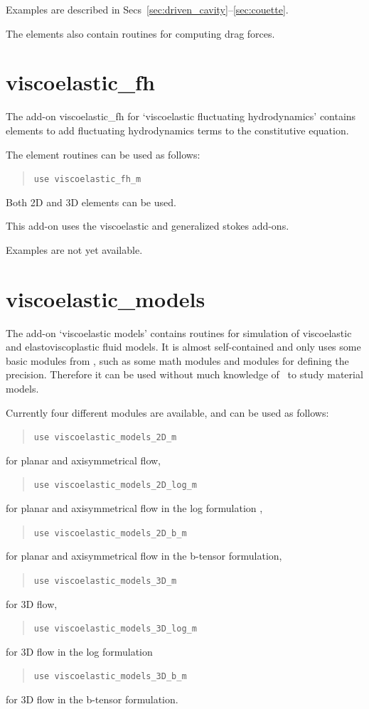 Examples are described in Secs~\ref{sec:driven_cavity}--\ref{sec:couette}.

The elements also contain routines for computing drag forces.

\section{viscoelastic\_fh}
\label{sec:viscoelastic_fh}

The add-on viscoelastic\_fh for `viscoelastic fluctuating hydrodynamics' contains elements to
add fluctuating hydrodynamics terms to the constitutive equation.

The element routines can be used as follows:
\begin{quote}
   \texttt{use viscoelastic\_fh\_m}
\end{quote}
Both 2D and 3D elements can be used.

This add-on uses the viscoelastic and generalized stokes add-ons.

Examples are not yet available.


\section{viscoelastic\_models}
\label{sec:vemodels}

The add-on `viscoelastic models' contains routines for simulation of
viscoelastic and elastoviscoplastic fluid models. It is almost self-contained and only uses some basic 
modules from \tfem, such as some math modules and modules for defining the precision. Therefore it can be used without much knowledge of \tfem\ to study material models.

Currently four different modules are available, and
can be used as follows:
\begin{quote}
   \texttt{use viscoelastic\_models\_2D\_m}
\end{quote}
for planar and axisymmetrical flow,
\begin{quote}
   \texttt{use viscoelastic\_models\_2D\_log\_m}
\end{quote}
for planar and axisymmetrical flow in the log formulation \cite{Hulsen05},
\begin{quote}
   \texttt{use viscoelastic\_models\_2D\_b\_m}
\end{quote}
for planar and axisymmetrical flow in the b-tensor formulation,
\begin{quote}
   \texttt{use viscoelastic\_models\_3D\_m}
\end{quote}
for 3D flow,
\begin{quote}
   \texttt{use viscoelastic\_models\_3D\_log\_m}
\end{quote}
for 3D flow in the log formulation \cite{Hulsen05}
\begin{quote}
   \texttt{use viscoelastic\_models\_3D\_b\_m}
\end{quote}
for 3D flow in the b-tensor formulation.

